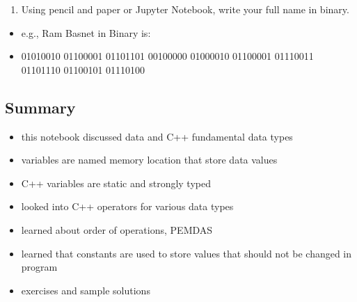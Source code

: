 \documentclass[11pt]{article}
\makeatletter
\providecommand{\tightlist}{%
      \setlength{\itemsep}{0pt}\setlength{\parskip}{0pt}}
\newcommand{\boxspacing}{\kern\kvtcb@left@rule\kern\kvtcb@boxsep}
\newcommand{\prompt}[4]{
        {\ttfamily\llap{{\color{#2}[#3]:\hspace{3pt}#4}}\vspace{-\baselineskip}}
    }
\makeatother
\begin{document}
    \begin{enumerate}
\def\labelenumi{\arabic{enumi}.}
\setcounter{enumi}{7}
\tightlist
\item
  Using pencil and paper or Jupyter Notebook, write your full name in
  binary.
\end{enumerate}

\begin{itemize}
\tightlist
\item
  e.g., Ram Basnet in Binary is:
\item
  01010010 01100001 01101101 00100000 01000010 01100001 01110011
  01101110 01100101 01110100
\end{itemize}

    \hypertarget{summary}{%
\subsection{Summary}\label{summary}}

\begin{itemize}
\tightlist
\item
  this notebook discussed data and C++ fundamental data types
\item
  variables are named memory location that store data values
\item
  C++ variables are static and strongly typed
\item
  looked into C++ operators for various data types
\item
  learned about order of operations, PEMDAS
\item
  learned that constants are used to store values that should not be
  changed in program
\item
  exercises and sample solutions
\end{itemize}

    \begin{tcolorbox}[breakable, size=fbox, boxrule=1pt, pad at break*=1mm,colback=cellbackground, colframe=cellborder]
\prompt{In}{incolor}{ }{\boxspacing}
\begin{Verbatim}[commandchars=\\\{\}]

\end{Verbatim}
\end{tcolorbox}


    
    
    
\end{document}
